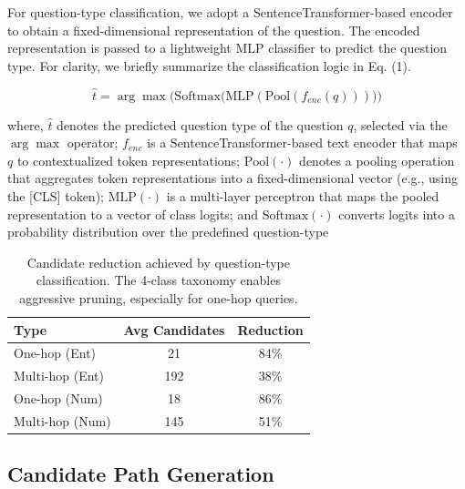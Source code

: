 \documentclass[conference]{IEEEtran}
\begin{document}
For question-type classification, we adopt a SentenceTransformer-based encoder to obtain a fixed-dimensional representation of the question. The encoded representation is passed to a lightweight MLP classifier to predict the question type. For clarity, we briefly summarize the classification logic in Eq. (1).

\begin{equation}
    \hat{t} = \arg\max\!\Big(\text{Softmax}\big(\text{MLP}(\text{Pool}(f_{enc}(q)))\big)\Big)
    \label{eq:type_prediction}
\end{equation}

\noindent where, $\hat{t}$ denotes the predicted question type of the question $q$, selected via the $\arg\max$ operator; $f_{enc}$ is a SentenceTransformer-based text encoder that maps $q$ to contextualized token representations; $\text{Pool}(\cdot)$ denotes a pooling operation that aggregates token representations into a fixed-dimensional vector (e.g., using the [CLS] token); $\text{MLP}(\cdot)$ is a multi-layer perceptron that maps the pooled representation to a vector of class logits; and $\text{Softmax}(\cdot)$ converts logits into a probability distribution over the predefined question-type 



\begin{table}[t]
\centering
\caption{Candidate reduction achieved by question-type classification. The 4-class taxonomy enables aggressive pruning, especially for one-hop queries.}
\label{tab:classifier}
\begin{tabular}{lcc}
\toprule
Type & Avg Candidates & Reduction \\
\midrule
One-hop (Ent) & 21 & 84\% \\
Multi-hop (Ent) & 192 & 38\% \\
One-hop (Num) & 18 & 86\% \\
Multi-hop (Num) & 145 & 51\% \\
\bottomrule
\end{tabular}
\end{table}

\subsection{Candidate Path Generation}
\end{document}
